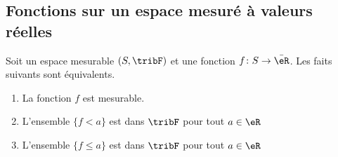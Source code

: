 \subsection{Fonctions sur un espace mesuré à valeurs réelles}

\begin{theorem}
    Soit un espace mesurable \( (S,\tribF)\) et une fonction \( f\colon S\to \bar \eR\). Les faits suivants sont équivalents.
    \begin{enumerate}
        \item\label{ITEMooHAMHooYLqUhVi}
            La fonction \( f\) est mesurable.
        \item\label{ITEMooHAMHooYLqUhVii}
            L'ensemble \( \{ f<a \}\) est dans \( \tribF\) pour tout \( a\in \eR\)
        \item\label{ITEMooHAMHooYLqUhViii}
            L'ensemble \( \{ f\leq a \}\) est dans \( \tribF\) pour tout \( a\in \eR\)
    \end{enumerate}
\end{theorem}

